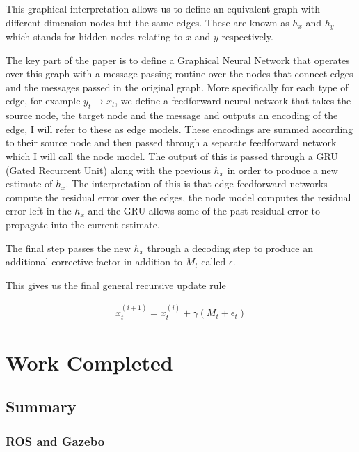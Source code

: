 \documentclass[]{../resources/final_report}
\begin{document}
This graphical interpretation allows us to define an equivalent graph with different dimension nodes but the same edges. These are known as $h_x$ and $h_y$ which stands for hidden nodes relating to $x$ and $y$ respectively. 


The key part of the paper is to define a Graphical Neural Network that operates over this graph with a message passing routine over the nodes that connect edges and the messages passed in the original graph. More specifically for each type of edge, for example $y_t \rightarrow x_t$, we define a feedforward neural network that takes the source node, the target node and the message and outputs an encoding of the edge, I will refer to these as edge models.
These encodings are summed according to their source node and then passed through a separate feedforward network which I will call the node model. The output of this is passed through a GRU (Gated Recurrent Unit) along with the previous $h_x$ in order to produce a new estimate of $h_x$.
The interpretation of this is that edge feedforward networks compute the residual error over the edges, the node model computes the residual error left in the $h_x$ and the GRU allows some of the past residual error to propagate into the current estimate.

The final step passes the new $h_x$ through a decoding step to produce an additional corrective factor in addition to $M_t$ called $\epsilon$.

This gives us the final general recursive update rule

\begin{align}
  x_t^{(i+1)} = x_t^{(i)} + \gamma (M_t + \epsilon_t)
\end{align}




\chapter{Work Completed}

\section{Summary}
\subsection{ROS and Gazebo}
\end{document}
